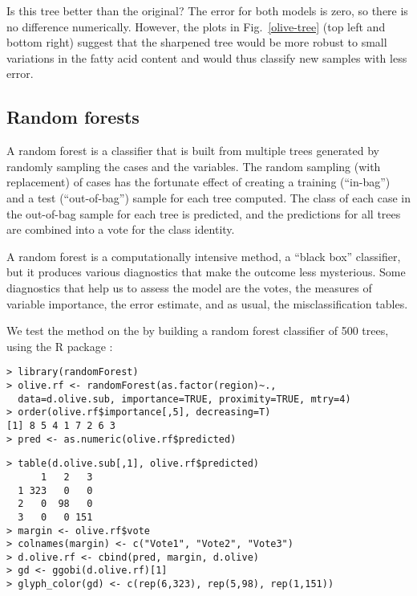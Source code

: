 \noindent Is this tree better than the original?  The error for both
models is zero, so there is no difference numerically.  However, the
plots in Fig.~\ref{olive-tree} (top left and bottom right) suggest
that the sharpened tree would be more robust to small variations in
the fatty acid content and would thus classify new samples with less
error.


\subsection{Random forests}
\label{random-forests}

A random forest \cite{Br01,Cu04} is a classifier that is built from
multiple trees generated by randomly sampling the cases and the
variables.  The random sampling (with replacement) of cases has the
fortunate effect of creating a training (``in-bag'') and a test
(``out-of-bag'') sample for each tree computed.  The class of each
case in the out-of-bag sample for each tree is predicted, and the
predictions for all trees are combined into a vote for the class
identity.  

A random forest is a computationally intensive method, a ``black box''
classifier, but it produces various diagnostics that make the outcome
less mysterious.  Some diagnostics that help us to assess the
model are the votes, the measures of variable importance, the error
estimate, and as usual, the misclassification tables.


We test the method on the  by building a random
forest classifier of 500 trees, using the R package 
\cite{Li06}:

\begin{verbatim}
> library(randomForest)
> olive.rf <- randomForest(as.factor(region)~., 
  data=d.olive.sub, importance=TRUE, proximity=TRUE, mtry=4)
> order(olive.rf$importance[,5], decreasing=T)
[1] 8 5 4 1 7 2 6 3
> pred <- as.numeric(olive.rf$predicted)
\end{verbatim}
\newpage  %
\begin{verbatim}
> table(d.olive.sub[,1], olive.rf$predicted)
      1   2   3
  1 323   0   0
  2   0  98   0
  3   0   0 151
> margin <- olive.rf$vote
> colnames(margin) <- c("Vote1", "Vote2", "Vote3")
> d.olive.rf <- cbind(pred, margin, d.olive)
> gd <- ggobi(d.olive.rf)[1]
> glyph_color(gd) <- c(rep(6,323), rep(5,98), rep(1,151))
\end{verbatim}

